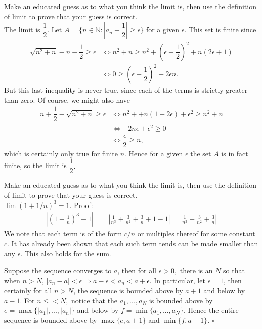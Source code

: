 \documentclass[12pt]{book}
\newenvironment{exercise}[2][Exercise]{\begin{trivlist}
\item[\hskip \labelsep {\bfseries #1}\hskip \labelsep {\bfseries #2.}]}{\end{trivlist}}
\begin{document}
\begin{exercise}{2.2.5}
Make an educated guess as to what you think the limit is, then use the definition of limit to prove that your guess is correct.\\

The limit is $\dfrac{1}{2}$. Let $A = \{ n \in \mathbb{N} : |a_n - \dfrac{1}{2}| \geq \epsilon\}$ for a given $\epsilon.$ This set is finite since \begin{align*}
\sqrt{n^2 + n} - n - \dfrac{1}{2} \geq \epsilon & \Leftrightarrow n^2 + n \geq n^2 + \left(\epsilon + \dfrac{1}{2}\right)^2 + n(2\epsilon + 1) \\
& \Leftrightarrow 0 \geq \left( \epsilon + \dfrac{1}{2} \right)^2 + 2 \epsilon n. \end{align*}
But this last inequality is never true, since each of the terms is strictly greater than zero. Of course, we might also have 
\begin{align*}
n+\dfrac{1}{2} - \sqrt{n^2 + n} \geq \epsilon & \Leftrightarrow n^2 + +n(1-2\epsilon) + \epsilon^2 \geq n^2 + n \\
& \Leftrightarrow -2n\epsilon + \epsilon^2 \geq 0 \\
& \Leftrightarrow \dfrac{\epsilon}{2} \geq n,
\end{align*}
which is certainly only true for finite $n$. Hence for a given $\epsilon$ the set $A$ is in fact finite, so the limit is $\dfrac{1}{2}.$ 
\end{exercise}


\begin{exercise}{2.2.6}
Make an educated guess as to what you think the limit is, then use the definition of limit to prove that your guess is correct.\\

$\lim (1 + 1/n)^3 = 1$. Proof:
	\begin{align*}
		| (1+ \frac{1}{n})^3 -1 | &= | \frac{1}{n^3} + \frac{3}{n^2}+ \frac{3}{n} + 1 - 1| = | \frac{1}{n^3} + \frac{3}{n^2}+ \frac{3}{n} |	
		\end{align*}
We note that each term is of the form $c/n$ or multiples thereof for some constant $c$. It has already been shown that each such term tends can be made smaller than any $\epsilon$. This also holds for the sum.
\end{exercise}

\begin{exercise}{2.2.7}
Suppose the sequence converges to $a$, then for all $\epsilon > 0,$ there is an $N$ so that when $n > N$, $|a_n - a| < \epsilon \Rightarrow a- \epsilon < a_n < a+\epsilon.$ In particular, let $\epsilon = 1$, then certainly for all $n > N$, the sequence is bounded above by $a+1$ and below by $a-1$. For $n \leq < N,$ notice that the $a_1, ..., a_N$ is bounded above by $e = \max \{|a_1|, ..., |a_n|\}$ and below by $f = \min \{a_1, ..., a_N\}.$ Hence the entire sequence is bounded above by $\max \{e, a+1\}$ and $\min \{f, a-1\}.$ $\square$
\end{exercise}
\end{document}

